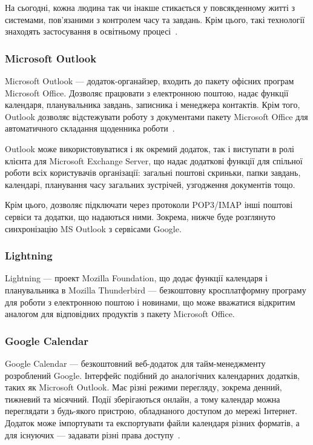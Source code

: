 На сьогодні, кожна людина так чи інакше стикається у повсякденному житті з системами, пов'язаними з контролем часу та завдань. Крім цього, такі технології знаходять застосування в освітньому процесі~\cite{ліщина2014проблеми}.

\subsubsection{Microsoft Outlook}

Microsoft Outlook — додаток-органайзер, входить до пакету офісних програм Microsoft Office. Дозволяє працювати з електронною поштою, надає функції календаря, планувальника завдань, записника і менеджера контактів. Крім того, Outlook дозволяє відстежувати роботу з документами пакету Microsoft Office для автоматичного складання щоденника роботи~\cite{франчук2016використання}.

Outlook може використовуватися  і як окремий додаток, так і виступати в ролі клієнта для Microsoft Exchange Server, що надає додаткові функції для спільної роботи всіх користувачів організації: загальні поштові скриньки, папки завдань, календарі, планування часу загальних зустрічей, узгодження документів тощо.

Крім цього, дозволяє підключати через протоколи POP3/IMAP інші поштові сервіси та додатки, що надаються ними. Зокрема, нижче буде розглянуто синхронізацію MS Outlook з сервісами Google.

\subsubsection{Lightning}

Lightning — проект Mozilla Foundation, що додає функції календаря і планувальника в Mozilla Thunderbird — безкоштовну кросплатформну програму для роботи з електронною поштою і новинами, що може вважатися відкритим аналогом для відповідних продуктів з пакету Microsoft Office.


\subsubsection{Google Calendar}

Google Calendar — безкоштовний веб-додаток для тайм-менеджменту розроблений Google. Інтерфейс подібний до аналогічних календарних додатків, таких як Microsoft Outlook. Має різні режими перегляду, зокрема денний, тижневий та місячний. Події зберігаються онлайн, а тому календар можна переглядати з будь-якого пристрою, обладнаного доступом до мережі Інтернет. Додаток може імпортувати та експортувати файли календаря різних форматів, а для існуючих — задавати різні права доступу~\cite{олексюк2013деякі}. 

